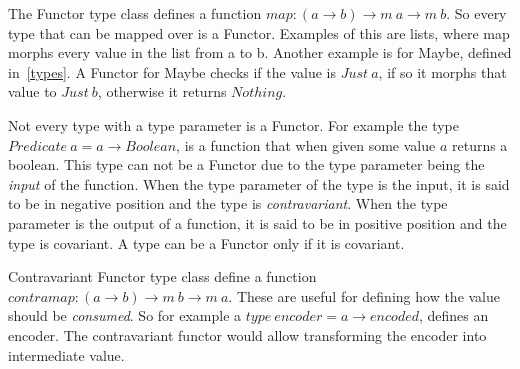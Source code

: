 The Functor type class defines a function $map : (a\rightarrow b) \rightarrow m\
a \rightarrow m\ b$. So every type that can be mapped over is a Functor.
Examples of this are lists, where map morphs every value in the list from a to
b. Another example is for Maybe, defined in~\ref{types}. A Functor for Maybe
checks if the value is $Just\ a$, if so it morphs that value to $Just\ b$,
otherwise it returns $Nothing$. 

Not every type with a type parameter is a Functor. For example the type
$Predicate\ a = a \rightarrow Boolean$, is a function that when given some value
$a$ returns a boolean. This type can not be a Functor due to the type parameter
being the \textit{input} of the function. When the type parameter of the type is
the input, it is said to be in negative position and the type is
\textit{contravariant}.  When the type parameter is the output of a function, it
is said to be in positive position and the type is covariant. A type can be a
Functor only if it is covariant.

Contravariant Functor type class define a function $contramap : (a\rightarrow b)
\rightarrow m\ b \rightarrow m\ a$. These are useful for defining how the value
should be \textit{consumed}. So for example a $type\ encoder = a\rightarrow
encoded$, defines an encoder. The contravariant functor would allow transforming
the encoder into intermediate value.




